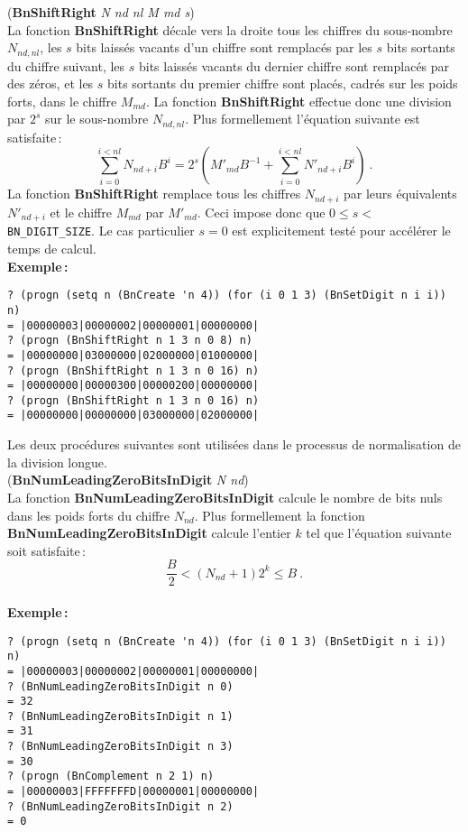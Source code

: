 \vspace*{24pt}
({\bf BnShiftRight} {\em N nd nl M md s})
\\[12pt]
La fonction {\bf BnShiftRight} d\'ecale vers la droite tous les chiffres du
sous-nombre $N_{nd,nl}$, les $s$ bits laiss\'es vacants d'un
chiffre sont remplac\'es par les $s$ bits sortants du chiffre suivant,
les $s$ bits laiss\'es vacants du dernier chiffre sont remplac\'es par des
z\'eros, et les $s$ bits sortants du premier chiffre sont plac\'es,
cadr\'es sur les poids forts, dans le chiffre $M_{md}$. La fonction
{\bf BnShiftRight} effectue donc une division par $2^s$ sur le sous-nombre
$N_{nd,nl}$. Plus formellement l'\'equation suivante est satisfaite\,:
\[ \sum_{i=0}^{i<nl}N_{nd+i} B^i = 2^s(M'_{md}B^{-1} + \sum_{i=0}^{i<nl}N'_{nd+i} B^i)\ .\]
La fonction {\bf BnShiftRight} remplace tous les chiffres $N_{nd+i}$ par leurs
\'equivalents $N'_{nd+i}$ et le chiffre $M_{md}$ par $M'_{md}$. Ceci impose
donc que $0 \leq s < $ \verb+BN_DIGIT_SIZE+. Le cas particulier $s = 0$ est
explicitement test\'e pour acc\'el\'erer le temps de calcul.
\\[18pt]
{\bf Exemple\,:}
\begin{verbatim}
? (progn (setq n (BnCreate 'n 4)) (for (i 0 1 3) (BnSetDigit n i i)) n)
= |00000003|00000002|00000001|00000000|
? (progn (BnShiftRight n 1 3 n 0 8) n)
= |00000000|03000000|02000000|01000000|
? (progn (BnShiftRight n 1 3 n 0 16) n)
= |00000000|00000300|00000200|00000000|
? (progn (BnShiftRight n 1 3 n 0 16) n)
= |00000000|00000000|03000000|02000000|
\end{verbatim}
\vspace*{24pt}
Les deux proc\'edures suivantes sont utilis\'ees dans le processus de
normalisation de la division longue.
\\[24pt]
({\bf BnNumLeadingZeroBitsInDigit} {\em N nd})
\\[12pt]
La fonction {\bf BnNumLeadingZeroBitsInDigit} calcule le nombre de bits nuls
dans les poids forts du chiffre $N_{nd}$. Plus formellement la fonction
{\bf BnNumLeadingZeroBitsInDigit} calcule l'entier $k$ tel que l'\'equation
suivante soit satisfaite\,:
\[ \frac{B}{2} < (N_{nd} + 1) 2^k \leq B\ .\]
\\[18pt]
{\bf Exemple\,:}
\begin{verbatim}
? (progn (setq n (BnCreate 'n 4)) (for (i 0 1 3) (BnSetDigit n i i)) n)
= |00000003|00000002|00000001|00000000|
? (BnNumLeadingZeroBitsInDigit n 0)
= 32
? (BnNumLeadingZeroBitsInDigit n 1)
= 31
? (BnNumLeadingZeroBitsInDigit n 3)
= 30
? (progn (BnComplement n 2 1) n)
= |00000003|FFFFFFFD|00000001|00000000|
? (BnNumLeadingZeroBitsInDigit n 2)
= 0
\end{verbatim}
